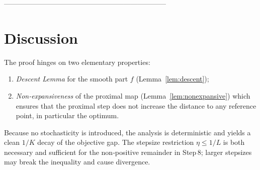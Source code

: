 \documentclass{article}
\begin{document}
---------------------------------------------------------------------

\section*{Discussion}
The proof hinges on two elementary properties:
\begin{enumerate}
\item \emph{Descent Lemma} for the smooth part $f$ (Lemma~\ref{lem:descent});
\item \emph{Non‑expansiveness} of the proximal map (Lemma~\ref{lem:nonexpansive}) which ensures that the proximal step does not increase the distance to any reference point, in particular the optimum.
\end{enumerate}
Because no stochasticity is introduced, the analysis is deterministic and yields a clean $1/K$ decay of the objective gap. The stepsize restriction $\eta\le1/L$ is both necessary and sufficient for the non‑positive remainder in Step 8; larger stepsizes may break the inequality and cause divergence.
\end{document}
